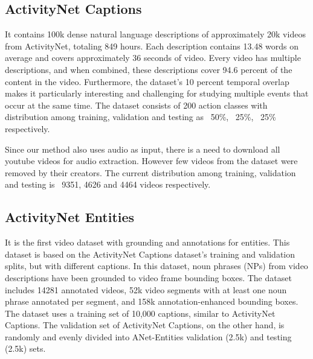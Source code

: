 \subsection{ActivityNet Captions \cite{krishna2017densecaptioning}}

\par It contains 100k dense natural language descriptions of approximately 20k videos from ActivityNet, totaling 849 hours. Each description contains 13.48 words on average and covers approximately 36 seconds of video. Every video has multiple descriptions, and when combined, these descriptions cover 94.6 percent of the content in the video. Furthermore, the dataset's 10 percent temporal overlap makes it particularly interesting and challenging for studying multiple events that occur at the same time. The dataset consists of 200 action classes with distribution among training, validation and testing as ~50\%, ~25\%, ~25\% respectively. 
\par Since our method also uses audio as input, there is a need to download all youtube videos for audio extraction. However few videos from the dataset were removed by their creators. The current distribution among training, validation and testing is ~9351, 4626 and 4464 videos respectively.

\subsection{ActivityNet Entities \cite{zhou2018grounded}}

\par It is the first video dataset with grounding and annotations for entities. This dataset is based on the ActivityNet Captions dataset's training and validation splits, but with different captions. In this dataset, noun phrases (NPs) from video descriptions have been grounded to video frame bounding boxes. The dataset includes 14281 annotated videos, 52k video segments with at least one noun phrase annotated per segment, and 158k annotation-enhanced bounding boxes. The dataset uses a training set of 10,000 captions, similar to ActivityNet Captions. The validation set of ActivityNet Captions, on the other hand, is randomly and evenly divided into ANet-Entities validation (2.5k) and testing (2.5k) sets.



